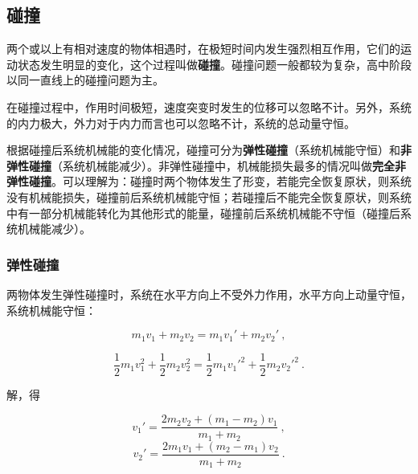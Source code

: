 
\subsection{碰撞}

两个或以上有相对速度的物体相遇时，在极短时间内发生强烈相互作用，它们的运动状态发生明显的变化，这个过程叫做\textbf{碰撞}。碰撞问题一般都较为复杂，高中阶段以同一直线上的碰撞问题为主。

在碰撞过程中，作用时间极短，速度突变时发生的位移可以忽略不计。另外，系统的内力极大，外力对于内力而言也可以忽略不计，系统的总动量守恒。

根据碰撞后系统机械能的变化情况，碰撞可分为\textbf{弹性碰撞}（系统机械能守恒）和\textbf{非弹性碰撞}（系统机械能减少）。非弹性碰撞中，机械能损失最多的情况叫做\textbf{完全非弹性碰撞}。可以理解为：碰撞时两个物体发生了形变，若能完全恢复原状，则系统没有机械能损失，碰撞前后系统机械能守恒；若碰撞后不能完全恢复原状，则系统中有一部分机械能转化为其他形式的能量，碰撞前后系统机械能不守恒（碰撞后系统机械能减少）。

\subsubsection{弹性碰撞}

两物体发生弹性碰撞时，系统在水平方向上不受外力作用，水平方向上动量守恒，系统机械能守恒：

\begin{equation}
m_1v_1+m_2v_2=m_1v_1'+m_2v_2'~,
\end{equation}

\begin{equation}
\frac12m_1v_1^2+\frac12m_2v_2^2=\frac12m_1v_1'^2+\frac12m_2v_2'^2~.
\end{equation}

解，得

\begin{equation}
v_1'= \frac{2m_2v_2 + (m_1 - m_2)v_1}{m_1+m_2}~,
\end{equation}
\begin{equation}
v_2'= \frac{2m_1v_1 + (m_2 - m_1)v_2}{m_1+m_2}~.
\end{equation}

